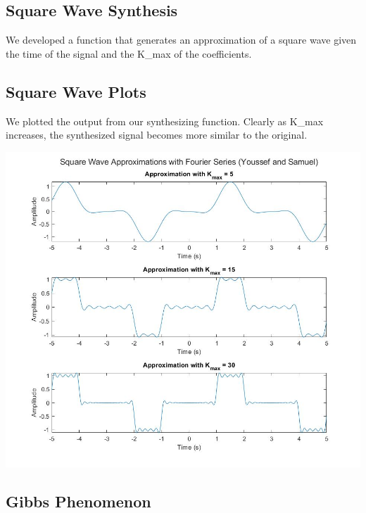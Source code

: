 \documentclass[11pt]{article}
\begin{document}
\begin{framed}
	
\end{framed}

\subsection{Square Wave Synthesis}

We developed a function that generates an approximation of a square wave
given the time of the signal and the K\_{max} of the coefficients.

\begin{framed}
	
\end{framed}

\pagebreak
\subsection{Square Wave Plots}

We plotted the output from our synthesizing function.
Clearly as K\_{max} increases, the synthesized signal becomes
more similar to the original.

\includegraphics[width=\textwidth]{squarewaves.png}

\begin{framed}
	
\end{framed}

\subsection{Gibbs Phenomenon}
\end{document}

